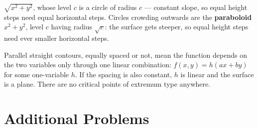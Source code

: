 \begin{solutions}
        $\sqrt{x^{2}+y^{2}}$, whose level $c$ is a circle of radius $c$ ---
        constant slope, so equal height steps need equal horizontal steps.
        Circles crowding outwards are the \textbf{paraboloid}
        $x^{2}+y^{2}$, level $c$ having radius $\sqrt{c}$: the surface gets
        steeper, so equal height steps need ever smaller horizontal steps.
  \item Parallel straight contours, equally spaced or not, mean the
        function depends on the two variables only through one linear
        combination: $f(x,y)=h(ax+by)$ for some one-variable $h$. If the
        spacing is also constant, $h$ is linear and the surface is a plane.
        There are no critical points of extremum type anywhere.
\end{solutions}

\section{Additional Problems}

